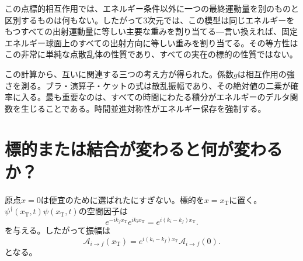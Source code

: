 \begin{classroomqa}
\end{classroomqa}


この点標的相互作用では、エネルギー条件以外に一つの最終運動量を別のものと区別するものは何もない。したがって3次元では、この模型は同じエネルギーをもつすべての出射運動量に等しい主要な重みを割り当てる---言い換えれば、固定エネルギー球面上のすべての出射方向に等しい重みを割り当てる。その等方性はこの非常に単純な点散乱体の性質であり、すべての実在の標的の性質ではない。

この計算から、互いに関連する三つの考え方が得られた。係数\(g\)は相互作用の強さを測る。ブラ・演算子・ケットの式は散乱振幅であり、その絶対値の二乗が確率に入る。最も重要なのは、すべての時間にわたる積分がエネルギーのデルタ関数を生じることである。時間並進対称性がエネルギー保存を強制する。

\section{標的または結合が変わると何が変わるか？}

原点\(x=0\)は便宜のために選ばれたにすぎない。標的を\(x=x_{\mathrm T}\)に置く。\(\psi^\dagger(x_{\mathrm T},t)\psi(x_{\mathrm T},t)\)の空間因子は
\begin{equation}
e^{-ik_f x_{\mathrm T}}e^{ik_i x_{\mathrm T}}
=e^{i(k_i-k_f)x_{\mathrm T}}.
\end{equation}
を与える。したがって振幅は
\begin{equation}
\mathcal A_{i\to f}(x_{\mathrm T})
=e^{i(k_i-k_f)x_{\mathrm T}}
\mathcal A_{i\to f}(0).
\end{equation}
となる。

\begin{classroomqa}
\end{classroomqa}

